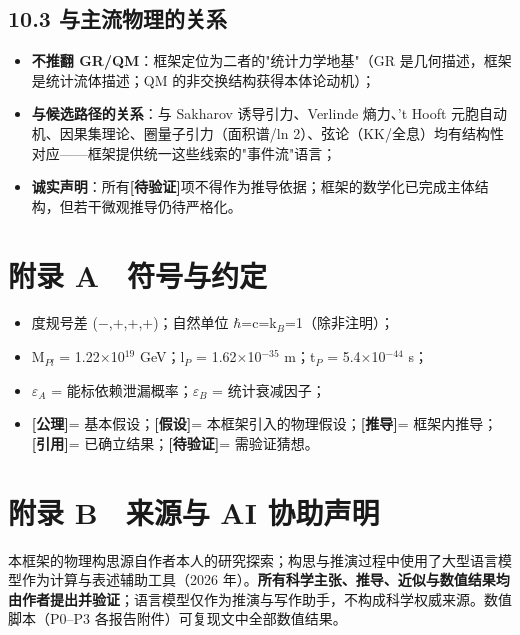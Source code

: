 \documentclass[12pt]{article}
\newcommand{\mtag}[1]{\textbf{[#1]}}
\newcommand{\up}[1]{\ensuremath{^{#1}}}
\newcommand{\down}[1]{\ensuremath{_{#1}}}
\begin{document}
\subsection{10.3 与主流物理的关系}

\begin{itemize}
\item \textbf{不推翻 GR/QM}：框架定位为二者的"统计力学地基"（GR 是几何描述，框架是统计流体描述；QM 的非交换结构获得本体论动机）；
\item \textbf{与候选路径的关系}：与 Sakharov 诱导引力、Verlinde 熵力、't Hooft 元胞自动机、因果集理论、圈量子引力（面积谱/ln 2）、弦论（KK/全息）均有结构性对应------框架提供统一这些线索的"事件流"语言；
\item \textbf{诚实声明}：所有\mtag{待验证}项不得作为推导依据；框架的数学化已完成主体结构，但若干微观推导仍待严格化。
\end{itemize}



\section*{附录 A　符号与约定}

\begin{itemize}
\item 度规号差 (\ensuremath{-},+,+,+)；自然单位 \ensuremath{\hbar}=c=k\down{B}=1（除非注明）；
\item M\down{Pl} = 1.22\ensuremath{\times}10\up{19} GeV；l\down{P} = 1.62\ensuremath{\times}10\up{-35} m；t\down{P} = 5.4\ensuremath{\times}10\up{-44} s；
\item \ensuremath{\varepsilon}\down{A} = 能标依赖泄漏概率；\ensuremath{\varepsilon}\down{B} = 统计衰减因子；
\item \mtag{公理}= 基本假设；\mtag{假设}= 本框架引入的物理假设；\mtag{推导}= 框架内推导；\mtag{引用}= 已确立结果；\mtag{待验证}= 需验证猜想。
\end{itemize}

\section*{附录 B　来源与 AI 协助声明}

本框架的物理构思源自作者本人的研究探索；构思与推演过程中使用了大型语言模型作为计算与表述辅助工具（2026 年）。\textbf{所有科学主张、推导、近似与数值结果均由作者提出并验证}；语言模型仅作为推演与写作助手，不构成科学权威来源。数值脚本（P0--P3 各报告附件）可复现文中全部数值结果。
\end{document}
